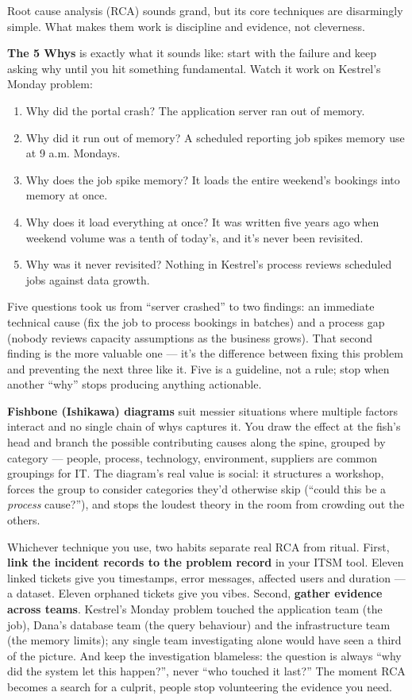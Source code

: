 Root cause analysis (RCA) sounds grand, but its core techniques are disarmingly simple. What makes them work is discipline and evidence, not cleverness.


\textbf{The 5 Whys} is exactly what it sounds like: start with the failure and keep asking why until you hit something fundamental. Watch it work on Kestrel's Monday problem:


\begin{enumerate}[leftmargin=*]
\item Why did the portal crash? The application server ran out of memory.
\item Why did it run out of memory? A scheduled reporting job spikes memory use at 9 a.m. Mondays.
\item Why does the job spike memory? It loads the entire weekend's bookings into memory at once.
\item Why does it load everything at once? It was written five years ago when weekend volume was a tenth of today's, and it's never been revisited.
\item Why was it never revisited? Nothing in Kestrel's process reviews scheduled jobs against data growth.
\end{enumerate}

Five questions took us from ``server crashed'' to two findings: an immediate technical cause (fix the job to process bookings in batches) and a process gap (nobody reviews capacity assumptions as the business grows). That second finding is the more valuable one — it's the difference between fixing this problem and preventing the next three like it. Five is a guideline, not a rule; stop when another ``why'' stops producing anything actionable.


\textbf{Fishbone (Ishikawa) diagrams} suit messier situations where multiple factors interact and no single chain of whys captures it. You draw the effect at the fish's head and branch the possible contributing causes along the spine, grouped by category — people, process, technology, environment, suppliers are common groupings for IT. The diagram's real value is social: it structures a workshop, forces the group to consider categories they'd otherwise skip (``could this be a \emph{process} cause?''), and stops the loudest theory in the room from crowding out the others.


Whichever technique you use, two habits separate real RCA from ritual. First, \textbf{link the incident records to the problem record} in your ITSM tool. Eleven linked tickets give you timestamps, error messages, affected users and duration — a dataset. Eleven orphaned tickets give you vibes. Second, \textbf{gather evidence across teams}. Kestrel's Monday problem touched the application team (the job), Dana's database team (the query behaviour) and the infrastructure team (the memory limits); any single team investigating alone would have seen a third of the picture. And keep the investigation blameless: the question is always ``why did the system let this happen?'', never ``who touched it last?'' The moment RCA becomes a search for a culprit, people stop volunteering the evidence you need.



